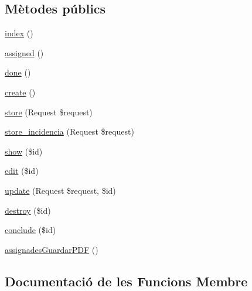 \subsection*{Mètodes públics}
\begin{DoxyCompactItemize}
\item 
\mbox{\hyperlink{class_app_1_1_http_1_1_controllers_1_1_incidencies_controller_a149eb92716c1084a935e04a8d95f7347}{index}} ()
\item 
\mbox{\hyperlink{class_app_1_1_http_1_1_controllers_1_1_incidencies_controller_ac725b27b2f4f767ab0071ea06921cc39}{assigned}} ()
\item 
\mbox{\hyperlink{class_app_1_1_http_1_1_controllers_1_1_incidencies_controller_af4152c13a06d002f268af780c0433c3a}{done}} ()
\item 
\mbox{\hyperlink{class_app_1_1_http_1_1_controllers_1_1_incidencies_controller_a435e7d7525d4bcd0ed5e34a469f3adf6}{create}} ()
\item 
\mbox{\hyperlink{class_app_1_1_http_1_1_controllers_1_1_incidencies_controller_a9ef485163104597c12185b53cdacf638}{store}} (Request \$request)
\item 
\mbox{\hyperlink{class_app_1_1_http_1_1_controllers_1_1_incidencies_controller_a3242addb15ea804f369df766324ffdfd}{store\+\_\+incidencia}} (Request \$request)
\item 
\mbox{\hyperlink{class_app_1_1_http_1_1_controllers_1_1_incidencies_controller_ae4914d07a9bbe4aede7a5dea759f6287}{show}} (\$id)
\item 
\mbox{\hyperlink{class_app_1_1_http_1_1_controllers_1_1_incidencies_controller_a459ed16587e3a50b39b672c7e473abc5}{edit}} (\$id)
\item 
\mbox{\hyperlink{class_app_1_1_http_1_1_controllers_1_1_incidencies_controller_affb03cc19897a1800a0f411264d6c7cc}{update}} (Request \$request, \$id)
\item 
\mbox{\hyperlink{class_app_1_1_http_1_1_controllers_1_1_incidencies_controller_a726fa8a4b4b187b9ca32ba427aac8137}{destroy}} (\$id)
\item 
\mbox{\hyperlink{class_app_1_1_http_1_1_controllers_1_1_incidencies_controller_a02fe9c154ef4bd43d3010d69a351230f}{conclude}} (\$id)
\item 
\mbox{\hyperlink{class_app_1_1_http_1_1_controllers_1_1_incidencies_controller_ae8d706d890a6181924f3c8ef53f67ec7}{assignades\+Guardar\+P\+DF}} ()
\end{DoxyCompactItemize}


\subsection{Documentació de les Funcions Membre}
\mbox{\label{class_app_1_1_http_1_1_controllers_1_1_incidencies_controller_ae8d706d890a6181924f3c8ef53f67ec7}} 

